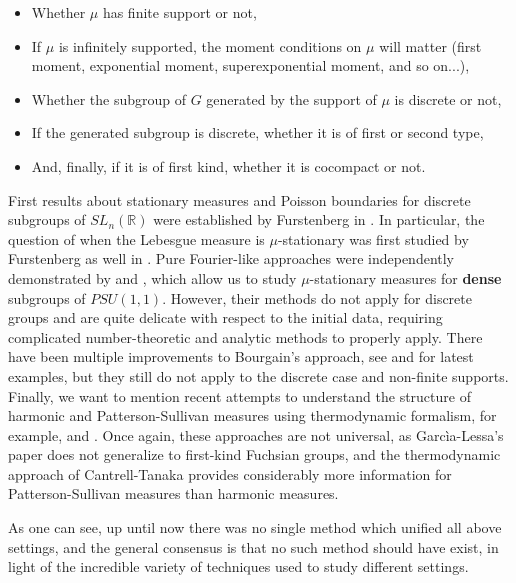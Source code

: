\documentclass[11pt]{article}
\begin{document}
\begin{itemize}
	\item Whether $\mu$ has finite support or not,
	\item If $\mu$ is infinitely supported, the moment conditions on $\mu$ will matter (first moment, exponential moment, superexponential moment, and so on...),
	\item Whether the subgroup of $G$ generated by the support of $\mu$ is discrete or not,
	\item If the generated subgroup is discrete, whether it is of first or second type,
	\item And, finally, if it is of first kind, whether it is cocompact or not.
\end{itemize}

First results about stationary measures and Poisson boundaries for discrete subgroups of $SL_n(\mathbb{R})$ were established by Furstenberg in \cite{furstenberg1963noncommuting}. In particular, the question of when the Lebesgue measure is $\mu$-stationary was first studied by Furstenberg as well in \cite{furstenberg71}. Pure Fourier-like approaches were independently demonstrated by \cite{Bourgain2012} and \cite{MR2969625}, which allow us to study $\mu$-stationary measures for \textbf{dense} subgroups of $PSU(1,1)$. However, their methods do not apply for discrete groups and are quite delicate with respect to the initial data, requiring complicated number-theoretic and analytic methods to properly apply. There have been multiple improvements to Bourgain's approach, see \cite{lequen2022absolutely} and \cite{kittle2023absolutely} for latest examples, but they still do not apply to the discrete case and non-finite supports. Finally, we want to mention recent attempts to understand the structure of harmonic and Patterson-Sullivan measures using thermodynamic formalism, for example, \cite{garcía2023dimension} and \cite{cantrell2022invariant}. Once again, these approaches are not universal, as Garc\`{i}a-Lessa's paper does not generalize to first-kind Fuchsian groups, and the thermodynamic approach of Cantrell-Tanaka provides considerably more information for Patterson-Sullivan measures than harmonic measures.

As one can see, up until now there was no single method which unified all above settings, and the general consensus is that no such method should have exist, in light of the incredible variety of techniques used to study different settings. 
\end{document}
